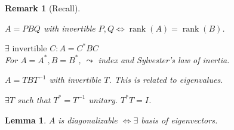 \documentclass[a4paper]{article}
\newcounter{lecref}[section]
\numberwithin{lecref}{section}
\newtheorem{lemma}[lecref]{Lemma}
\newtheorem*{Remark}{Remark}
\DeclareMathOperator{\rank}{rank}
\begin{document}
\begin{Remark}[Recall]\hfill{}
  \begin{description}
    {\leftskip=15pt
    \item[Equivalence] $A = PBQ$ with invertible $P,Q \iff \rank(A) = \rank(B)$.
    \item[Congruence] $\exists \text{ invertible } C: A = C^* BC$ \\
      For $A = A^*, B = B^*$, $\leadsto$ index and Sylvester's law of inertia.
    \item[Similarity] $A = TBT^{-1}$ with invertible $T$. This is related to eigenvalues.
    \item[Later on] $\exists T$ such that $T^* = T^{-1}$ unitary. $T^{*} T = I$.

    }
  \end{description}
\end{Remark}

\begin{lemma} %
  $A$ is diagonalizable $\iff \exists$ basis of eigenvectors.
\end{lemma}
\end{document}

